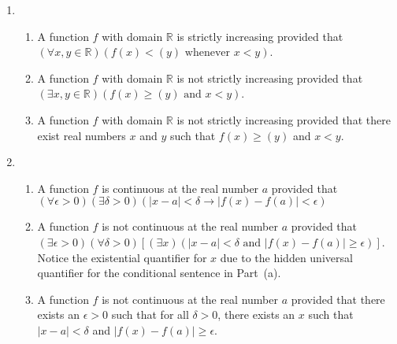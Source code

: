 \begin{enumerate}
\item \begin{enumerate}
\item A function $f$ with domain $\mathbb{R}$ is strictly increasing provided that \\
$\left( \forall x, y \in \mathbb{R} \right) \left( f \left( x \right) < \left( y \right) \text{ whenever } x < y \right)$.

\item A function $f$ with domain $\mathbb{R}$ is not strictly increasing provided that \\
$\left( \exists x, y \in \mathbb{R} \right) \left( f \left( x \right) \ge \left( y \right) \text{ and } x < y \right)$.

\item A function $f$ with domain $\mathbb{R}$ is not strictly increasing provided that there exist real numbers $x$ and $y$ such that $f \left( x \right) \ge \left( y \right)$ and $x < y$.
\end{enumerate}

\item \begin{enumerate}
\item A function $f$ is continuous at the real number $a$ provided that \\
$\left( \forall \epsilon > 0 \right) \left( \exists \delta > 0 \right) 
\left( \left| x - a \right| < \delta \to \left| f \left( x \right) - f \left( a \right) \right| < \epsilon \right)$

\item A function $f$ is not continuous at the real number $a$ provided that \\
$\left( \exists \epsilon > 0 \right) \left( \forall \delta > 0 \right) 
\left[ \left( \exists x \right) \left( \left| x - a \right| < \delta \text{ and } 
\left| f \left( x \right) - f \left( a \right) \right| \ge \epsilon \right) \right]$.  Notice the existential quantifier for $x$ due to the hidden universal quantifier for the conditional sentence in Part~(a).

\item A function $f$ is not continuous at the real number $a$ provided that there exists an $\epsilon > 0$ such that for all $\delta > 0$, there exists an $x$ such that 
$\left| x - a \right| < \delta$ and 
$\left| f \left( x \right) - f \left( a \right) \right| \ge \epsilon$.
\end{enumerate}



\end{enumerate}
